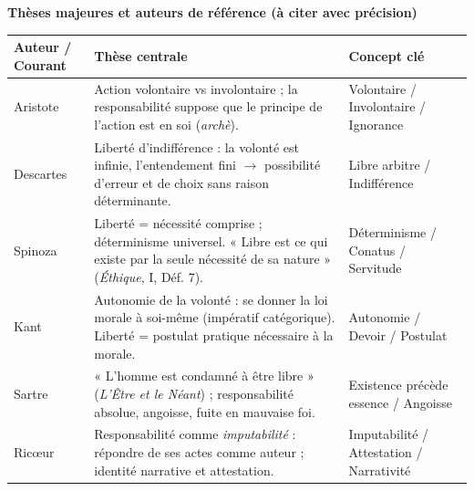\documentclass[11pt]{article}
\begin{document}
\begin{aretenir}
\textbf{Thèses majeures et auteurs de référence (à citer avec précision)}
\begin{center}
\begin{tabularx}{\linewidth}{|l|X|X|}\hline
\textbf{Auteur / Courant} & \textbf{Thèse centrale} & \textbf{Concept clé} \\ \hline
\rowcolor{popblueL}
Aristote & Action volontaire vs involontaire ; la responsabilité suppose que le principe de l'action est en soi (\emph{archè}). & Volontaire / Involontaire / Ignorance \\ \hline
Descartes & Liberté d'indifférence : la volonté est infinie, l'entendement fini $\to$ possibilité d'erreur et de choix sans raison déterminante. & Libre arbitre / Indifférence \\ \hline
\rowcolor{poporangeL}
Spinoza & Liberté = nécessité comprise ; déterminisme universel. « Libre est ce qui existe par la seule nécessité de sa nature » (\emph{Éthique}, I, Déf. 7). & Déterminisme / Conatus / Servitude \\ \hline
Kant & Autonomie de la volonté : se donner la loi morale à soi-même (impératif catégorique). Liberté = postulat pratique nécessaire à la morale. & Autonomie / Devoir / Postulat \\ \hline
\rowcolor{popgreenL}
Sartre & « L'homme est condamné à être libre » (\emph{L'Être et le Néant}) ; responsabilité absolue, angoisse, fuite en mauvaise foi. & Existence précède essence / Angoisse \\ \hline
Ricœur & Responsabilité comme \emph{imputabilité} : répondre de ses actes comme auteur ; identité narrative et attestation. & Imputabilité / Attestation / Narrativité \\ \hline
\end{tabularx}
\end{center}


\end{aretenir}
\end{document}
